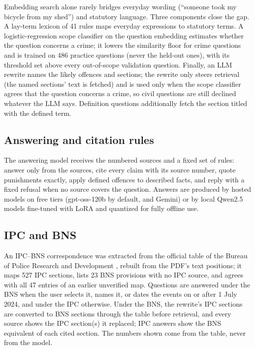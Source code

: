 \documentclass[conference]{IEEEtran}
\begin{document}
Embedding search alone rarely bridges everyday wording (``someone took my bicycle from my shed'')
and statutory language. Three components close the gap. A lay-term lexicon of 41 rules maps
everyday expressions to statutory terms. A logistic-regression scope classifier on the question
embedding estimates whether the question concerns a crime; it lowers the similarity floor for crime
questions and is trained on 486 practice questions (never the held-out ones), with its threshold set
above every out-of-scope validation question. Finally, an LLM rewrite names the likely offences and
sections; the rewrite only steers retrieval (the named sections' text is fetched) and is used only
when the scope classifier agrees that the question concerns a crime, so civil questions are still
declined whatever the LLM says. Definition questions additionally fetch the section titled with the
defined term.

\subsection{Answering and citation rules}

The answering model receives the numbered sources and a fixed set of rules: answer only from the
sources, cite every claim with its source number, quote punishments exactly, apply defined offences
to described facts, and reply with a fixed refusal when no source covers the question. Answers are
produced by hosted models on free tiers (gpt-oss-120b \cite{openai2025gptoss} by default, and Gemini)
or by local Qwen2.5 models \cite{qwen2024qwen25} fine-tuned with LoRA \cite{hu2022lora} and quantized
\cite{dettmers2023qlora} for fully offline use.

\subsection{IPC and BNS}

An IPC--BNS correspondence was extracted from the official table of the Bureau of Police Research and
Development \cite{bprd2024table}, rebuilt from the PDF's text positions; it maps 527 IPC sections,
lists 23 BNS provisions with no IPC source, and agrees with all 47 entries of an earlier unverified
map. Questions are answered under the BNS when the user selects it, names it, or dates the events on
or after 1 July 2024, and under the IPC otherwise. Under the BNS, the rewrite's IPC sections are
converted to BNS sections through the table before retrieval, and every source shows the IPC
section(s) it replaced; IPC answers show the BNS equivalent of each cited section. The numbers shown
come from the table, never from the model.
\end{document}
